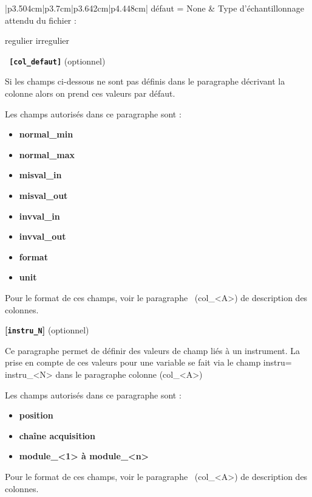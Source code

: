 {\begin{center}
\begin{supertabular}{|p{3.504cm}|p{3.7cm}|p{3.642cm}|p{4.448cm}|}
défaut = None &
Type d{}'échantillonnage attendu du fichier :

regulier {\textbar} irregulier\\\hline
\end{supertabular}
\end{center}

\medskip
\texttt{\textbf{\large \color{blue} {[col\_defaut]}}} (optionnel)

\medskip
Si les champs ci-dessous ne sont pas définis dans le paragraphe décrivant la colonne alors on prend ces valeurs par
défaut.

\medskip
Les champs autorisés dans ce paragraphe sont :

\begin{itemize}
\item {\bfseries
normal\_min}
\item {\bfseries
normal\_max}
\item {\bfseries
misval\_in}
\item {\bfseries
misval\_out}
\item {\bfseries
invval\_in}
\item {\bfseries
invval\_out}
\item {\bfseries
format}
\item {\bfseries
unit}
\end{itemize}

\medskip
Pour le format de ces champs, voir le paragraphe \ (col\_{\textless}A{\textgreater}) de description des colonnes.

\medskip
\large      \color{blue}\textbf{[\texttt{instru\_N}]}
\normalsize \color{black} (optionnel)

\medskip
Ce paragraphe permet de définir des valeurs de champ liés à un instrument. La prise en compte de ces valeurs pour une
variable se fait via le champ instru= instru\_{\textless}N{\textgreater} dans le paragraphe colonne
(col\_{\textless}A{\textgreater})

\medskip
Les champs autorisés dans ce paragraphe sont :

\begin{itemize}
\item {\bfseries
position}
\item {\bfseries
chaîne acquisition}
\item {\bfseries
module\_{\textless}1{\textgreater} à module\_{\textless}n{\textgreater} }
\end{itemize}

\medskip
Pour le format de ces champs, voir le paragraphe \ (col\_{\textless}A{\textgreater}) de description des colonnes.

}
